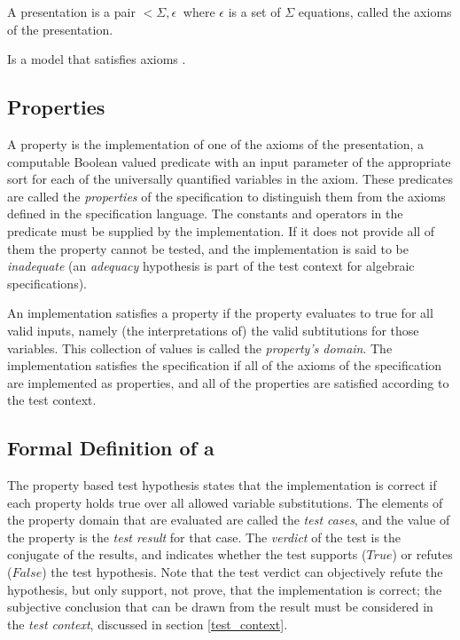 {\begin{df}[Presentation]
A presentation is a pair $<\Sigma, \epsilon\>$ where
$\epsilon$ is a set of $\Sigma$ equations, called the axioms of the presentation.
\end{df}

\begin{df}
Is a model that satisfies axioms .
\end{df}

\subsection{Properties} \label{formal_pbt}

A property is the implementation of one of the axioms of the presentation,
a computable Boolean valued predicate with an input parameter of the appropriate sort
for each of the universally quantified variables in the axiom.
These predicates are called the \emph{properties} of the specification
to distinguish them from the axioms defined in the specification language.
The constants and operators in the predicate must be supplied by the implementation.
If it does not provide all of them the property cannot be tested,
and  the implementation is said to be \emph{inadequate}
(an \emph{adequacy} hypothesis is part of the test context for algebraic specifications).

An implementation satisfies a property if
the property evaluates to true for all valid inputs,
namely (the interpretations of) the valid subtitutions for those variables.
This collection of values is called the \emph{property's domain}.
The implementation satisfies the specification if 
all of the axioms of the specification are implemented as properties,
and all of the properties are satisfied according to the test context.

\subsection{Formal Definition of a \pbt}

The property based test hypothesis states that the implementation is correct
if each property holds true over all allowed variable substitutions.
The elements of the property domain that are evaluated
are called the \emph{test cases},
and the value of the property is the \emph{test result} for that case.
The \emph{verdict} of the test is the conjugate of the results,
and indicates whether the test supports ($True$) or refutes ($False$) the test hypothesis.
Note that the test verdict can objectively refute the hypothesis,
but only support, not prove, that the implementation is correct;
the subjective conclusion that can be drawn from the result must be considered in the \emph{test context},
discussed in section \ref{test_context}.

}
